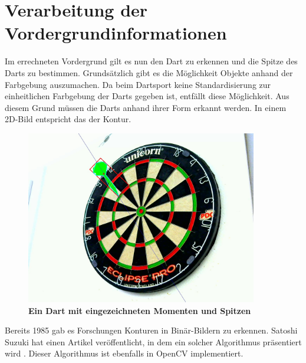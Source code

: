 \section{Verarbeitung der Vordergrundinformationen}
\label{sec:foreground}
Im errechneten Vordergrund gilt es nun den Dart zu erkennen und die Spitze des Darts zu bestimmen. Grundsätzlich gibt es die Möglichkeit Objekte anhand der Farbgebung auszumachen. Da beim Dartsport keine Standardisierung zur einheitlichen Farbgebung der Darts gegeben ist, entfällt diese Möglichkeit. Aus diesem Grund müssen die Darts anhand ihrer Form erkannt werden. In einem 2D-Bild entspricht das der Kontur.
\begin{figure}[ht]
\centering
\includegraphics[width=0.9\textwidth]{media/backgroundfeature}
\caption{\textbf{Ein Dart mit eingezeichneten Momenten und Spitzen}}
\label{Fig:detecteddart}
\end{figure}

Bereits 1985 gab es Forschungen Konturen in Binär-Bildern zu erkennen. Satoshi Suzuki hat einen Artikel veröffentlicht, in dem ein solcher Algorithmus präsentiert wird \autocite{contour1985}. Dieser Algorithmus ist ebenfalls in OpenCV implementiert. 

